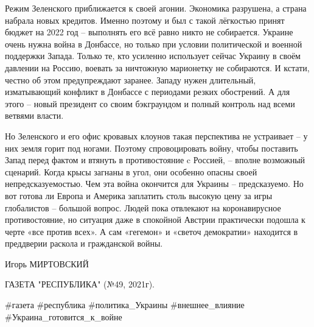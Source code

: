 Режим Зеленского приближается к своей агонии. Экономика разрушена, а страна
набрала новых кредитов. Именно поэтому и был с такой лёгкостью принят бюджет на
2022 год – выполнять его всё равно никто не собирается. Украине очень нужна
война в Донбассе, но только при условии политической и военной поддержки
Запада. Только те, кто усиленно использует сейчас Украину в своём давлении на
Россию, воевать за ничтожную марионетку не собираются. И кстати, честно об этом
предупреждают заранее. Западу нужен длительный, изматывающий конфликт в
Донбассе с периодами резких обострений. А для этого – новый президент со своим
бэкграундом и полный контроль над всеми ветвями власти.

Но Зеленского и его офис кровавых клоунов такая перспектива не устраивает – у
них земля горит под ногами. Поэтому спровоцировать войну, чтобы поставить Запад
перед фактом и втянуть в противостояние c Россией, – вполне возможный сценарий.
Когда крысы загнаны в угол, они особенно опасны своей непредсказуемостью. Чем
эта война окончится для Украины – предсказуемо. Но вот готова ли Европа и
Америка заплатить столь высокую цену за игры глобалистов – большой вопрос.
Людей пока отвлекают на коронавирусное противостояние, но ситуация даже в
спокойной Австрии практически подошла к черте «все против всех». А сам
«гегемон» и «светоч демократии» находится в преддверии раскола и гражданской
войны.

Игорь МИРТОВСКИЙ

ГАЗЕТА "РЕСПУБЛИКА" (№49, 2021г).

\#газета \#республика \#политика\_Украины \#внешнее\_влияние
\#Украина\_готовится\_к\_войне
